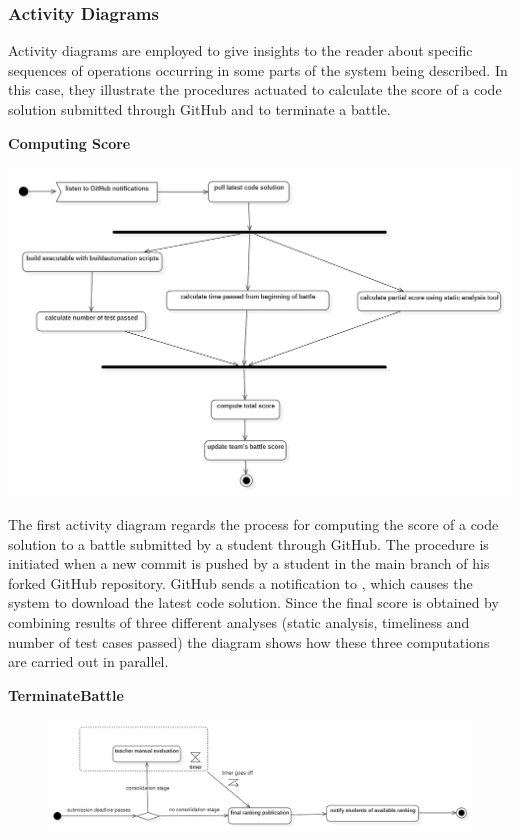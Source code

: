 \subsubsection{Activity Diagrams}
Activity diagrams are employed to give insights to the reader about specific sequences of operations occurring in some parts of the system being described.
In this case, they illustrate the procedures actuated to calculate the score of a code solution submitted through GitHub and to terminate a battle.  \\

\begin{minipage}{\linewidth}
	\textbf{Computing Score}\\
	
	
	\begin{center}
		\includegraphics[width=1\textwidth]{3Specific_Requirements/res/ActivityDiagramCalculateScore}
	\end{center}
\end{minipage}

The first activity diagram regards the process for computing the score of a code solution to a battle submitted by a student through GitHub. The procedure is initiated when a new commit is pushed by a student in the main branch of his forked GitHub repository. GitHub sends a notification to \app, which causes the system to download the latest code solution. Since the final score is obtained by combining results of three different analyses (static analysis, timeliness and number of test cases passed) the diagram shows how these three computations are carried out in parallel.

\newpage

\textbf{TerminateBattle}\\
\begin{figure}[h]
	\centering
	\includegraphics[width=1\textwidth]{3Specific_Requirements/res/ActivityDiagramTerminateBattle}
\end{figure}

